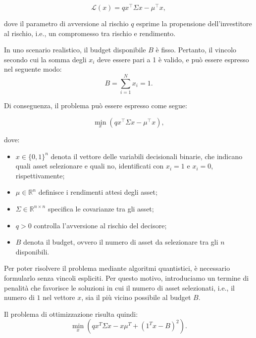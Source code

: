 \begin{equation}\label{eqn:funzioneObiettivo}
    \mathcal{L}(x) = q x^\top \Sigma x - \mu^\top x,
\end{equation}

dove il parametro di avversione al rischio \(q\) esprime la propensione 
dell'investitore al rischio, i.e., un compromesso tra rischio e rendimento.


In uno scenario realistico, il budget disponibile \(B\) è fisso. Pertanto, il 
vincolo secondo cui la somma degli \(x_i\) deve essere pari a 1 è valido, e può essere 
espresso nel seguente modo: 
\begin{equation}\label{eqn:vincoloBudget}
    B = \sum_{i=1}^N x_i = 1.
\end{equation}

Di conseguenza, il problema può essere espresso come segue:

\begin{equation}\label{eqn:funzioneProblema}
    \min_x (q x^\top \Sigma x - \mu^\top x),
\end{equation}

dove:
\begin{itemize}
    \item $x \in \{0,1\}^n$ denota il vettore delle variabili decisionali binarie, 
        che indicano quali asset selezionare e quali no, identificati con $x_i = 1$ 
        e $x_i = 0$, rispettivamente;
    \item $\mu \in \mathbb{R}^n$ definisce i rendimenti attesi degli asset;
    \item $\Sigma \in \mathbb{R}^{n \times n}$ specifica le covarianze tra gli asset;
    \item $q > 0$ controlla l'avversione al rischio del decisore;
    \item $B$ denota il budget, ovvero il numero di asset da selezionare tra gli $n$ 
        disponibili.
\end{itemize}

Per poter risolvere il problema mediante algoritmi quantistici, è necessario formularlo 
senza vincoli espliciti. Per questo motivo, introduciamo un termine di penalità che 
favorisce le soluzioni in cui il numero di asset selezionati, i.e., il numero di $1$ 
nel vettore $x$, sia il più vicino possibile al budget $B$.

Il problema di ottimizzazione risulta quindi:
\begin{equation}\label{eqn:funzioneProblemaConVincolo}
    \min_x \left(qx^T\Sigma x - x\mu^T + {({1}^T x - B)}^2\right).
\end{equation}

